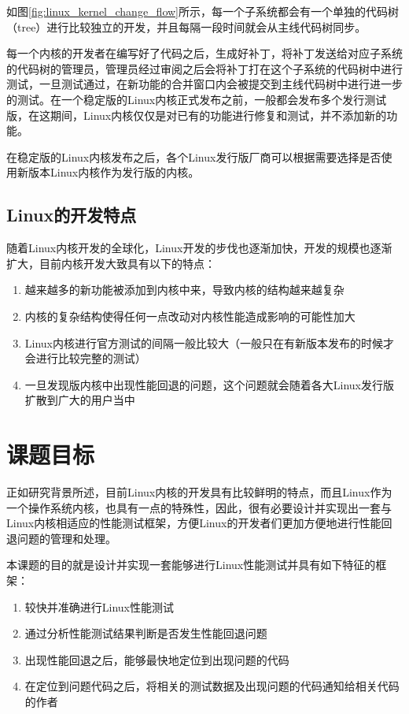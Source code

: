 如图\ref{fig:linux_kernel_change_flow}所示，每一个子系统都会有一个单独的代码树（tree）进行比较独立的开发，并且每隔一段时间就会从主线代码树同步。

每一个内核的开发者在编写好了代码之后，生成好补丁，将补丁发送给对应子系统的代码树的管理员，管理员经过审阅之后会将补丁打在这个子系统的代码树中进行测试，一旦测试通过，在新功能的合并窗口内会被提交到主线代码树中进行进一步的测试。在一个稳定版的Linux内核正式发布之前，一般都会发布多个发行测试版，在这期间，Linux内核仅仅是对已有的功能进行修复和测试，并不添加新的功能。

在稳定版的Linux内核发布之后，各个Linux发行版厂商可以根据需要选择是否使用新版本Linux内核作为发行版的内核。

\subsection{Linux的开发特点}

随着Linux内核开发的全球化，Linux开发的步伐也逐渐加快，开发的规模也逐渐扩大，目前内核开发大致具有以下的特点：

\begin{enumerate}
\item 越来越多的新功能被添加到内核中来，导致内核的结构越来越复杂
\item 内核的复杂结构使得任何一点改动对内核性能造成影响的可能性加大
\item Linux内核进行官方测试的间隔一般比较大（一般只在有新版本发布的时候才会进行比较完整的测试）
\item 一旦发现版内核中出现性能回退的问题，这个问题就会随着各大Linux发行版扩散到广大的用户当中
\end{enumerate}

\section{课题目标}

正如研究背景所述，目前Linux内核的开发具有比较鲜明的特点，而且Linux作为一个操作系统内核，也具有一点的特殊性，因此，很有必要设计并实现出一套与Linux内核相适应的性能测试框架，方便Linux的开发者们更加方便地进行性能回退问题的管理和处理。

本课题的目的就是设计并实现一套能够进行Linux性能测试并具有如下特征的框架：

\begin{enumerate}
\item 较快并准确进行Linux性能测试
\item 通过分析性能测试结果判断是否发生性能回退问题
\item 出现性能回退之后，能够最快地定位到出现问题的代码
\item 在定位到问题代码之后，将相关的测试数据及出现问题的代码通知给相关代码的作者
\end{enumerate}